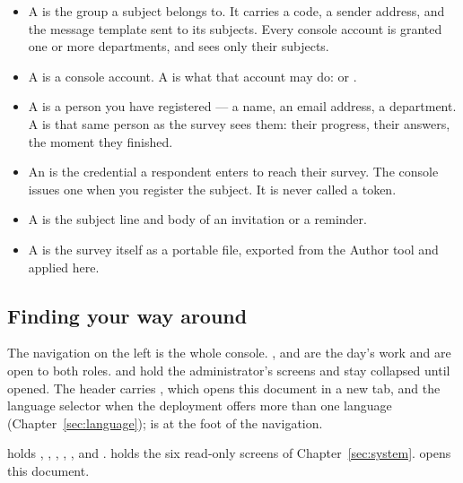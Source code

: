 \documentclass[11pt, a4paper]{article}
\begin{document}
\begin{itemize}
  \item A  is the group a subject belongs to. It carries a code, a sender
        address, and the message template sent to its subjects. Every
        console account is granted one or more departments, and sees only their subjects.
  \item A  is a console account. A  is what that account may do:
         or .
  \item A  is a person you have registered — a name, an email address, a
        department. A  is that same person as the survey sees them: their
        progress, their answers, the moment they finished.
  \item An  is the credential a respondent enters to reach their survey. The
        console issues one when you register the subject. It is never called a token.
  \item A  is the subject line and body of an invitation or a reminder.
  \item A  is the survey itself as a portable file, exported from the
        Author tool and applied here.
\end{itemize}

\subsection{Finding your way around}

The navigation on the left is the whole console. ,  and  are the day's work and are open to both roles.  and
 hold the administrator's screens and stay collapsed until opened. The header
carries , which opens this document in a new tab, and the language selector when the
deployment offers more than one language (Chapter~\ref{sec:language});  is at the
foot of the navigation.


\begin{elicitnote}
 holds , , , ,
,
 and .  holds the six
read-only screens of Chapter~\ref{sec:system}.  opens this document.
\end{elicitnote}
\end{document}
